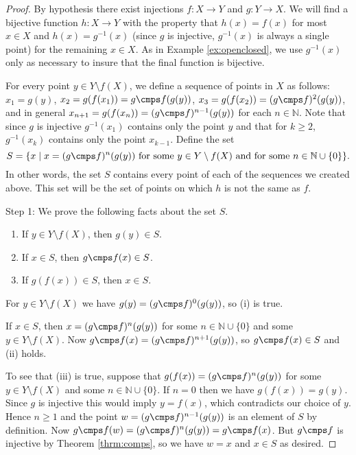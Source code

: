 \begin{proof}
By hypothesis there exist injections $f:X\to Y$ and $g:Y\to X$. We will
find a bijective function $h:X\to Y$ with the property that $h(x)=f(x)$
for most $x\in X$ and $h(x)=g^{-1}(x)$ (since $g$ is injective,
$g^{-1}(x)$ is always a single point) for the remaining $x\in X$.  As in
Example \ref{ex:openclosed}, we use $g^{-1}(x)$ only as necessary to
insure that the final function is bijective.

For every point $y\in Y\setminus f(X)$, we define a sequence of points
in $X$ as follows: $x_1=g(y)$, $x_2=g(f(x_1))=g\cmps f(g(y))$,
$x_3=g(f(x_2))=(g\cmps f)^2(g(y))$, and in general $x_{n+1}=
g(f(x_n))=(g\cmps f)^{n-1}(g(y))$ for each $n\in\mathbb N$.  Note that
since $g$ is injective $g^{-1}(x_1)$ contains only the point $y$ and
that for $k\geq2$, $g^{-1}(x_k)$ contains only the point $x_{k-1}$.
Define the set \[S=\{ x\mid x=(g\cmps f)^n(g(y)) \mbox{ for some } y\in
Y\setminus f(X) \mbox{ and for some } n\in\mathbb N\cup\{0\}\}.\]
In other words, the set $S$ contains every point of each of the
sequences we created above.  This set will be the set of points on which
$h$ is not the same as $f$.

\smallbreak\noindent
{\cscp Step 1:} We prove the following facts about the set $S$.
\begin{enumerate}
\item If $y\in Y\setminus f(X)$, then $g(y)\in S$.
\item If $x\in S$, then $g\cmps f (x)\in S$.
\item If $g(f(x))\in S$, then $x\in S$.
\end{enumerate}

For $y\in Y\setminus f(X)$ we have $g(y)=(g\cmps f)^0(g(y))$, so (i) is
true.

If $x\in S$, then $x=(g\cmps f)^n(g(y))$ for some $n\in\mathbb N \cup
\{0\}$ and some $y\in Y\setminus f(X)$.  Now $g\cmps f(x)=(g\cmps
f)^{n+1}(g(y))$, so $g\cmps f(x)\in S$ and (ii) holds.

To see that (iii) is true, suppose that $g(f(x))= (g\cmps f)^n(g(y))$
for some $y\in Y\setminus f(X)$ and some $n\in\mathbb N\cup\{0\}$.  If
$n=0$ then we have $g(f(x))=g(y)$.  Since $g$ is injective this would
imply $y=f(x)$, which contradicts our choice of $y$.  Hence $n\geq 1$
and the point $w=(g\cmps f)^{n-1}(g(y))$ is an element of $S$ by
definition.  Now $g\cmps f(w)=(g\cmps f)^n(g(y))=g\cmps f(x)$.  But
$g\cmps f$ is injective by Theorem \ref{thrm:comps}, so we have $w=x$
and $x\in S$ as desired.


\end{proof}
